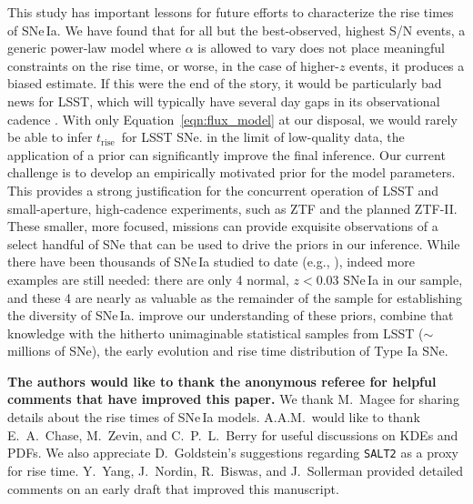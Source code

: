 \documentclass[twocolumn]{./aastex63}
\newcommand{\trise}{$t_\mathrm{rise}$}
\begin{document}
This study has important lessons for future efforts to characterize the rise
times of SNe\,Ia. We have found that for all but the best-observed, highest S/N
events, a generic power-law model where $\alpha$ is allowed to vary does not
place meaningful constraints on the rise time, or worse, in the case of
higher-$z$ events, it produces a biased estimate. If this were the end of the
story, it would be particularly bad news for LSST, which will typically have
several day gaps in its observational cadence \citep{Ivezic19}. With only
Equation~\ref{eqn:flux_model} at our disposal, we would rarely be able to
infer \trise\ for LSST SNe.  in the limit of low-quality data, the application of a 
prior can significantly improve the final inference. Our current challenge is
to develop an empirically motivated prior for the model parameters. This
provides a strong justification for the concurrent operation of LSST and
small-aperture, high-cadence experiments, such as ZTF and the planned ZTF-II.
These smaller, more focused, missions can provide exquisite observations of a
select handful of SNe that can be used to drive the priors in our inference.
While there have been thousands of SNe\,Ia studied to date (e.g.,
\citealt{Jones17}), indeed more examples are still needed: there are only 4
normal, $z < 0.03$ SNe\,Ia in our sample, and these 4 are nearly as valuable as
the remainder of the sample for establishing the diversity of SNe\,Ia.
 improve our understanding of these
priors,  combine that knowledge with the hitherto unimaginable
statistical samples from LSST ($\sim$millions of SNe),  the early evolution and rise time distribution of Type Ia SNe.

\acknowledgements

\textbf{The authors would like to thank the anonymous referee for helpful
comments that have improved this paper.} We thank M.~Magee for sharing details
about the rise times of SNe\,Ia models. A.A.M.~would like to thank
E.~A.~Chase, M.~Zevin, and C.~P.~L.~Berry for useful discussions on KDEs and
PDFs. We also appreciate D.~Goldstein's suggestions regarding \texttt{SALT2}
as a proxy for rise time. Y.~Yang, J.~Nordin, R.~Biswas, and J.~Sollerman
provided detailed comments on an early draft that improved this manuscript.
\end{document}
